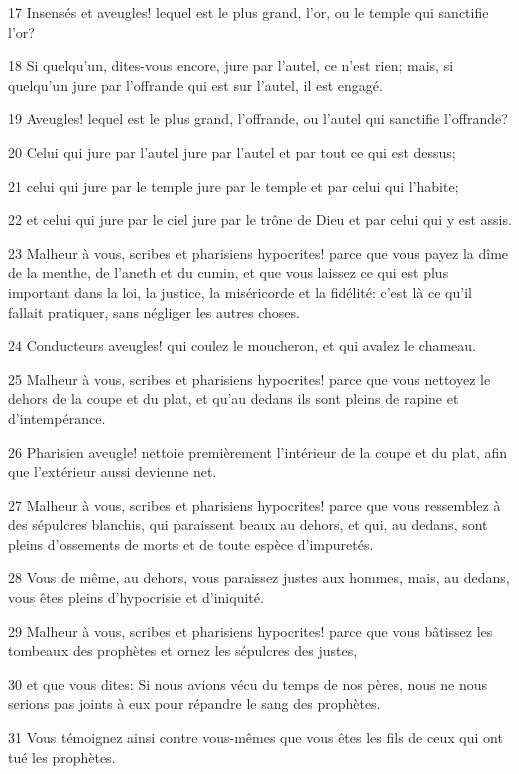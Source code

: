 \par 17 Insensés et aveugles! lequel est le plus grand, l'or, ou le temple qui sanctifie l'or?
\par 18 Si quelqu'un, dites-vous encore, jure par l'autel, ce n'est rien; mais, si quelqu'un jure par l'offrande qui est sur l'autel, il est engagé.
\par 19 Aveugles! lequel est le plus grand, l'offrande, ou l'autel qui sanctifie l'offrande?
\par 20 Celui qui jure par l'autel jure par l'autel et par tout ce qui est dessus;
\par 21 celui qui jure par le temple jure par le temple et par celui qui l'habite;
\par 22 et celui qui jure par le ciel jure par le trône de Dieu et par celui qui y est assis.
\par 23 Malheur à vous, scribes et pharisiens hypocrites! parce que vous payez la dîme de la menthe, de l'aneth et du cumin, et que vous laissez ce qui est plus important dans la loi, la justice, la miséricorde et la fidélité: c'est là ce qu'il fallait pratiquer, sans négliger les autres choses.
\par 24 Conducteurs aveugles! qui coulez le moucheron, et qui avalez le chameau.
\par 25 Malheur à vous, scribes et pharisiens hypocrites! parce que vous nettoyez le dehors de la coupe et du plat, et qu'au dedans ils sont pleins de rapine et d'intempérance.
\par 26 Pharisien aveugle! nettoie premièrement l'intérieur de la coupe et du plat, afin que l'extérieur aussi devienne net.
\par 27 Malheur à vous, scribes et pharisiens hypocrites! parce que vous ressemblez à des sépulcres blanchis, qui paraissent beaux au dehors, et qui, au dedans, sont pleins d'ossements de morts et de toute espèce d'impuretés.
\par 28 Vous de même, au dehors, vous paraissez justes aux hommes, mais, au dedans, vous êtes pleins d'hypocrisie et d'iniquité.
\par 29 Malheur à vous, scribes et pharisiens hypocrites! parce que vous bâtissez les tombeaux des prophètes et ornez les sépulcres des justes,
\par 30 et que vous dites: Si nous avions vécu du temps de nos pères, nous ne nous serions pas joints à eux pour répandre le sang des prophètes.
\par 31 Vous témoignez ainsi contre vous-mêmes que vous êtes les fils de ceux qui ont tué les prophètes.
